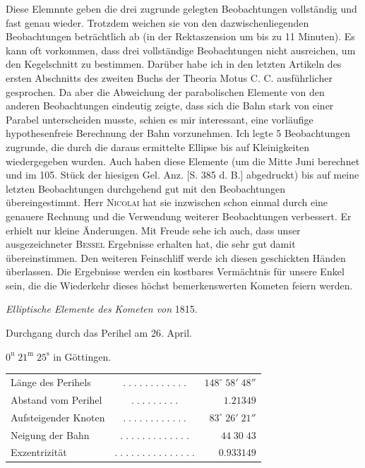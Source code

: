 \par\indent Diese Elemnnte geben die drei zugrunde gelegten Beobachtungen vollständig und fast genau wieder. Trotzdem weichen sie von den dazwischenliegenden Beobachtungen beträchtlich ab (in der Rektaszension um bis zu 11 Minuten). Es kann oft vorkommen, dass drei vollständige Beobachtungen nicht ausreichen, um den Kegelschnitt zu bestimmen. Darüber habe ich in den letzten Artikeln des ersten Abschnitts des zweiten Buchs der Theoria Motus C. C. ausführlicher gesprochen. Da aber die Abweichung der parabolischen Elemente von den anderen Beobachtungen eindeutig zeigte, dass sich die Bahn stark von einer Parabel unterscheiden musste, schien es mir interessant, eine vorläufige hypothesenfreie Berechnung der Bahn vorzunehmen. Ich legte 5 Beobachtungen zugrunde, die durch die daraus ermittelte Ellipse bis auf Kleinigkeiten wiedergegeben wurden. Auch haben diese Elemente (um die Mitte Juni berechnet und im 105. Stück der hiesigen Gel. Anz. [S. 385 d. B.] abgedruckt) bis auf meine letzten Beobachtungen durchgehend gut mit den Beobachtungen übereingestimmt. Herr \textsc{Nicolai} hat sie inzwischen schon einmal durch eine genauere Rechnung und die Verwendung weiterer Beobachtungen verbessert. Er erhielt nur kleine Änderungen. Mit Freude sehe ich auch, dass unser ausgezeichneter \textsc{Bessel} Ergebnisse erhalten hat, die sehr gut damit übereinstimmen. Den weiteren Feinschliff werde ich diesen geschickten Händen überlassen. Die Ergebnisse werden ein kostbares Vermächtnis für unsere Enkel sein, die die Wiederkehr dieses höchst bemerkenswerten Kometen feiern werden.

\begin{center}
\emph{Elliptische Elemente des Kometen von} 1815.
\end{center}

\begin{center}\fontsize{10}{12}\selectfont Durchgang durch das Perihel am 26. April.\par $0^{\mathrm u}\;21^{\mathrm m}\;25^{\mathrm s}$ in Göttingen.\end{center}
\begin{center}\fontsize{9}{11}\selectfont\setlength{\tabcolsep}{2pt}\renewcommand{\arraystretch}{1.15}\begin{tabular}{lcr}
Länge des Perihels & $.\;.\;.\;.\;.\;.\;.\;.\;.\;.\;.\;.$ & $148^\circ\;58'\;48''$\\
Abstand vom Perihel & $.\;.\;.\;.\;.\;.\;.\;.\;.$ & $1.21349$\\
Aufsteigender Knoten & $.\;.\;.\;.\;.\;.\;.\;.\;.\;.\;.\;.$ & $83^\circ\;26'\;21''$\\
Neigung der Bahn & $.\;.\;.\;.\;.\;.\;.\;.\;.\;.\;.\;.\;.$ & $44\;30\;43$\\
Exzentrizität & $.\;.\;.\;.\;.\;.\;.\;.\;.\;.\;.\;.\;.\;.\;.$ & $0.933149$\\
\end{tabular}\end{center}

